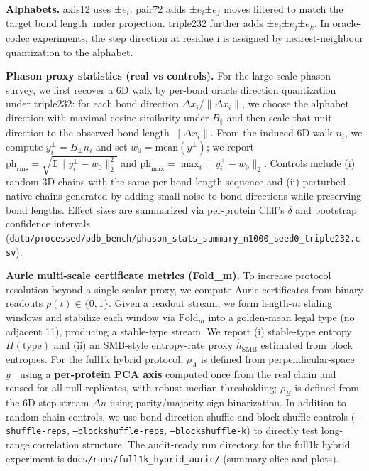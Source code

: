 \textbf{Alphabets.} axis12 uses ±$e_i$. pair72 adds ±$e_i$±$e_j$ moves filtered to match the target bond length under projection. triple232 further adds ±$e_i$±$e_j$±$e_k$. In oracle-codec experiments, the step direction at residue i is assigned by nearest-neighbour quantization to the alphabet.

\textbf{Phason proxy statistics (real vs controls).} For the large-scale phason survey, we first recover a 6D walk by per-bond oracle direction quantization under triple232: for each bond direction $\Delta x_i/\|\Delta x_i\|$, we choose the alphabet direction with maximal cosine similarity under $B_{\parallel}$ and then scale that unit direction to the observed bond length $\|\Delta x_i\|$. From the induced 6D walk $n_i$, we compute $y_i^{\perp}=B_{\perp}n_i$ and set $w_0=\mathrm{mean}(y^{\perp})$; we report $\mathrm{ph}_{\mathrm{rms}}=\sqrt{\mathbb{E}\|y_i^{\perp}-w_0\|_2^2}$ and $\mathrm{ph}_{\max}=\max_i\|y_i^{\perp}-w_0\|_2$. Controls include (i) random 3D chains with the same per-bond length sequence and (ii) perturbed-native chains generated by adding small noise to bond directions while preserving bond lengths. Effect sizes are summarized via per-protein Cliff's $\delta$ and bootstrap confidence intervals (\texttt{data/processed/pdb\_bench/phason\_stats\_summary\_n1000\_seed0\_triple232.csv}).

\textbf{Auric multi-scale certificate metrics (Fold\_m).} To increase protocol resolution beyond a single scalar proxy, we compute Auric certificates from binary readouts $\rho(t)\in\{0,1\}$. Given a readout stream, we form length-$m$ sliding windows and stabilize each window via $\mathrm{Fold}_m$ into a golden-mean legal type (no adjacent 11), producing a stable-type stream. We report (i) stable-type entropy $H(\mathrm{type})$ and (ii) an SMB-style entropy-rate proxy $\widehat{h}_{\mathrm{SMB}}$ estimated from block entropies. For the full1k hybrid protocol, $\rho_A$ is defined from perpendicular-space $y^\perp$ using a \textbf{per-protein PCA axis} computed once from the real chain and reused for all null replicates, with robust median thresholding; $\rho_B$ is defined from the 6D step stream $\Delta n$ using parity/majority-sign binarization. In addition to random-chain controls, we use bond-direction shuffle and block-shuffle controls (\texttt{--shuffle-reps}, \texttt{--blockshuffle-reps}, \texttt{--blockshuffle-k}) to directly test long-range correlation structure. The audit-ready run directory for the full1k hybrid experiment is \texttt{docs/runs/full1k\_hybrid\_auric/} (summary slice and plots).

